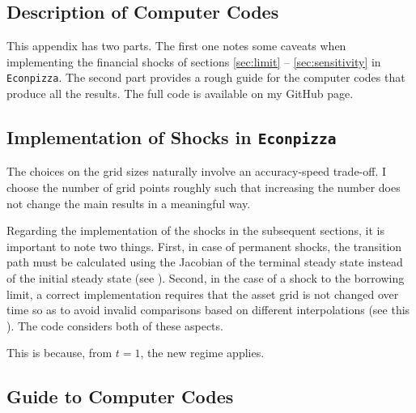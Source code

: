 \documentclass[12pt]{article} %
\numberwithin{equation}{section} %
\begin{document}
\begin{refsection}
\begin{appendices}
\thispagestyle{plain}
\section{Description of Computer Codes}
\label{sec-app:codes}

This appendix has two parts. The first one notes some caveats when implementing the financial shocks of sections \ref{sec:limit} -- \ref{sec:sensitivity} in \texttt{Econpizza}. The second part provides a rough guide for the computer codes that produce all the results. The full code is available on my GitHub page.

\subsection{Implementation of Shocks in \texttt{Econpizza}}
\label{sec-app:codes-ep}

The choices on the grid sizes naturally involve an accuracy-speed trade-off. I choose the number of grid points roughly such that increasing the number does not change the main results in a meaningful way.

Regarding the implementation of the shocks in the subsequent sections, it is important to note two things. First, in case of permanent shocks, the transition path must be calculated using the Jacobian of the terminal steady state instead of the initial steady state (see \cite{auclert2021}). Second, in the case of a shock to the borrowing limit, a correct implementation requires that the asset grid is not changed over time so as to avoid invalid comparisons based on different interpolations (see this \cite{mellior2016mimeo}). The code considers both of these aspects.


This is because, from $t=1$, the new regime applies.

\subsection{Guide to Computer Codes}
\label{sec-app:codes-guide}


\end{appendices}
\end{refsection}
\end{document}
